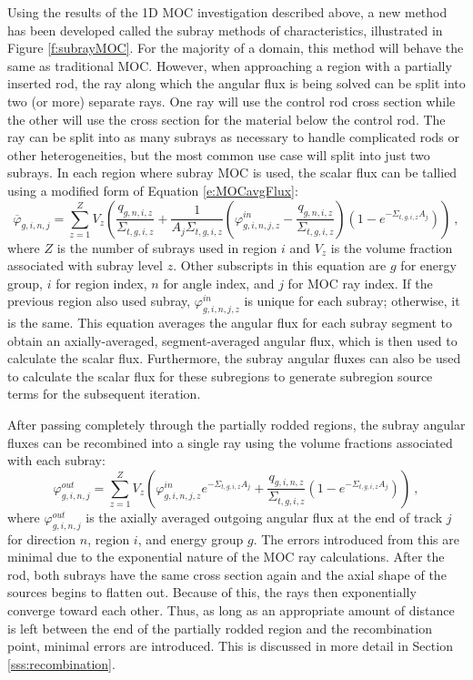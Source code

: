 Using the results of the 1D MOC investigation described above, a new method has been developed called the subray methods of characteristics, illustrated in Figure \ref{f:subrayMOC}.  For the majority of a domain, this method will behave the same as traditional MOC.  However, when approaching a region with a partially inserted rod, the ray along which the angular flux is being solved can be split into two (or more) separate rays.  One ray will use the control rod cross section while the other will use the cross section for the material below the control rod.  The ray can be split into as many subrays as necessary to handle complicated rods or other heterogeneities, but the most common use case will split into just two subrays.  In each region where subray MOC is used, the scalar flux can be tallied using a modified form of Equation \ref{e:MOCavgFlux}:
\begin{equation}
\overline{\varphi}_{g,i,n,j} = \sum_{z=1}^Z V_z \left(\frac{q_{g,n,i,z}}{\Sigma_{t,g,i,z}} + \frac{1}{A_j\Sigma_{t,g,i,z}}\left(\varphi^{in}_{g,i,n,j,z} - \frac{q_{g,n,i,z}}{\Sigma_{t,g,i,z}}\right)\left(1 - e^{-\Sigma_{t,g,i,z} A_j}\right)\right)\ ,
\end{equation}
where $Z$ is the number of subrays used in region $i$ and $V_z$ is the volume fraction associated with subray level $z$.  Other subscripts in this equation are $g$ for energy group, $i$ for region index, $n$ for angle index, and $j$ for MOC ray index.  If the previous region also used subray, $\varphi^{in}_{g,i,n,j,z}$ is unique for each subray; otherwise, it is the same.  This equation averages the angular flux for each subray segment to obtain an axially-averaged, segment-averaged angular flux, which is then used to calculate the scalar flux.  Furthermore, the subray angular fluxes can also be used to calculate the scalar flux for these subregions to generate subregion source terms for the subsequent iteration.

After passing completely through the partially rodded regions, the subray angular fluxes can be recombined into a single ray using the volume fractions associated with each subray:
\begin{equation}
\varphi^{out}_{g,i,n,j} = \sum_{z=1}^Z V_z \left(\varphi^{in}_{g,i,n,j,z}e^{-\Sigma_{t,g,i,z} A_j} + \frac{q_{g,i,n,z}}{\Sigma_{t,g,i,z}}\left(1 - e^{-\Sigma_{t,g,i,z}A_j}\right)\right)\ ,
\end{equation}
where $\varphi^{out}_{g,i,n,j}$ is the axially averaged outgoing angular flux at the end of track $j$ for direction $n$, region $i$, and energy group $g$.  The errors introduced from this are minimal due to the exponential nature of the MOC ray calculations.  After the rod, both subrays have the same cross section again and the axial shape of the sources begins to flatten out.  Because of this, the rays then exponentially converge toward each other.  Thus, as long as an appropriate amount of distance is left between the end of the partially rodded region and the recombination point, minimal errors are introduced.  This is discussed in more detail in Section \ref{sss:recombination}.

